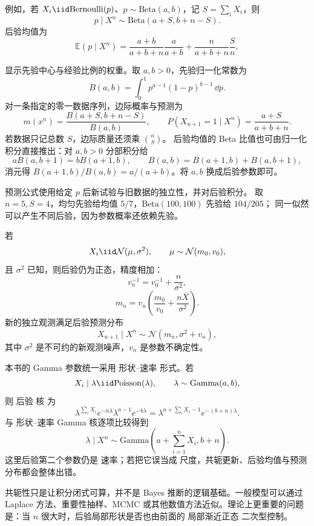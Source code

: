 \begin{workedexample}
例如，若 $X_i\iid\mathrm{Bernoulli}(p)$、$p\sim\mathrm{Beta}(a,b)$，记 $S=\sum_iX_i$，则
\[
 p\mid X^n\sim\mathrm{Beta}(a+S,b+n-S).
\]
后验均值为
\[
 \mathbb E(p\mid X^n)
 =\frac{a+b}{a+b+n}\frac{a}{a+b}
 +\frac{n}{a+b+n}\frac{S}{n},
\]

显示先验中心与经验比例的权重。取 $a,b>0$，先验归一化常数为
\[
 B(a,b)=\int_0^1p^{a-1}(1-p)^{b-1}\,\dd p.
\]
对一条指定的零一数据序列，边际概率与预测为
\[
 m(x^n)=\frac{B(a+S,b+n-S)}{B(a,b)},\qquad
 P(X_{n+1}=1\mid X^n)=\frac{a+S}{a+b+n}.
\]
若数据只记总数 $S$，边际质量还须乘 $\binom nS$。
后验均值的 Beta 比值也可由归一化积分直接推出：对 $a,b>0$ 分部积分给
\[
 aB(a,b+1)=bB(a+1,b),\qquad B(a,b)=B(a+1,b)+B(a,b+1),
\]
消元得 $B(a+1,b)/B(a,b)=a/(a+b)$。将 $a,b$ 换成后验参数即可。

预测公式使用给定 $p$ 后新试验与旧数据的独立性，并对后验积分。
取 $n=5,S=4$，均匀先验给均值 $5/7$，$\mathrm{Beta}(100,100)$ 先验给 $104/205$；
同一似然可以产生不同后验，因为参数概率还依赖先验。

\end{workedexample}

\begin{workedexample}[正态共轭的精度相加]
若
\[
 X_i\iid\mathcal N(\mu,\sigma^2),
 \qquad
 \mu\sim\mathcal N(m_0,v_0),
\]
且 $\sigma^2$ 已知，则后验仍为正态，精度相加：
\[
 v_n^{-1}=v_0^{-1}+\frac{n}{\sigma^2},
\]
\[
 m_n
 =v_n\left(\frac{m_0}{v_0}
 +\frac{n\overline X}{\sigma^2}\right).
\]
新的独立观测满足后验预测分布
\[
 X_{n+1}\mid X^n
 \sim\mathcal N(m_n,\sigma^2+v_n),
\]
其中 $\sigma^2$ 是不可约的新观测噪声，$v_n$ 是参数不确定性。
\end{workedexample}

\begin{workedexample}
本书的 Gamma 参数统一采用 形状--速率 形式。若
\[
 X_i\mid\lambda\iid\mathrm{Poisson}(\lambda),
 \qquad
 \lambda\sim\mathrm{Gamma}(a,b),
\]
则 后验 核 为
\[
 \lambda^{\sum_iX_i}e^{-n\lambda}
 \lambda^{a-1}e^{-b\lambda}
 =\lambda^{a+\sum_iX_i-1}
 e^{-(b+n)\lambda}.
\]
与 形状--速率 Gamma 核逐项比较得到
\[
 \lambda\mid X^n
 \sim\mathrm{Gamma}\!\left(a+\sum_{i=1}^nX_i,b+n\right).
\]
这里后验第二个参数仍是 速率；若把它误当成 尺度，共轭更新、后验均值与预测分布都会整体出错。
\end{workedexample}

共轭性只是让积分闭式可算，并不是 Bayes 推断的逻辑基础。一般模型可以通过 Laplace 方法、重要性抽样、MCMC 或其他数值方法近似。理论上更重要的问题是：当 $n$ 很大时，后验局部形状是否也由前面的 局部渐近正态 二次型控制。


